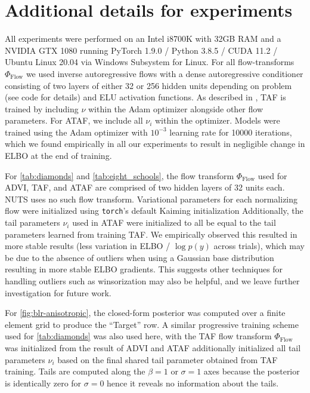 \documentclass[twoside]{article}
\theoremstyle{definition}
\theoremstyle{remark}
\begin{document}
{\section{Additional details for experiments}
\label{sec:additional-exp-details}

All experiments were performed on an Intel i8700K with 32GB RAM and a NVIDIA GTX 1080
running PyTorch 1.9.0 / Python 3.8.5 / CUDA 11.2 / Ubuntu Linux 20.04 via Windows Subsystem for Linux.
For all flow-transforms $\Phi_{\text{Flow}}$ we used inverse autoregressive flows \citep{kingma2016improved} with a
dense autoregressive conditioner consisting of two layers of either 32 or 256 hidden units depending on problem (see code for details) and
ELU activation functions.
As described in \cite{jaini2020tails}, TAF is trained by including $\nu$ within the Adam optimizer alongside other flow parameters. For ATAF, we include all $\nu_i$ within the optimizer.
Models were trained using the Adam optimizer with $10^{-3}$ learning rate
for 10000 iterations, which we found empirically in all our experiments to result in negligible change in ELBO
at the end of training.

For \cref{tab:diamonds} and \cref{tab:eight_schools}, the flow transform $\Phi_{\text{Flow}}$ used for ADVI, TAF, and ATAF
are comprised of two hidden layers of 32 units each. NUTS uses no such flow transform. Variational parameters for each normalizing flow were initialized
using \texttt{torch}'s default Kaiming initialization \citep{he2015delving} Additionally, the tail parameters $\nu_i$
used in ATAF were initialized to all be equal to the tail parameters learned from training TAF. We empirically observed
this resulted in more stable results (less variation in ELBO / $\log p(y)$ across trials), which may be due to
the absence of outliers when using a Gaussian base distribution resulting in more stable ELBO gradients. This suggests
other techniques for handling outliers such as winsorization may also be helpful, and we leave further investigation
for future work.


For \cref{fig:blr-anisotropic}, the closed-form posterior was computed over a finite element grid to produce
the ``Target'' row. A similar progressive training scheme used for \cref{tab:diamonds} was also used here, with
the TAF flow transform $\Phi_{\text{Flow}}$ was initialized from the result of ADVI and ATAF additionally initialized
all tail parameters $\nu_i$ based on the final shared tail parameter obtained from TAF training. Tails are computed
along the $\beta = 1$ or $\sigma = 1$ axes because the posterior is identically zero for $\sigma = 0$ hence it reveals
no information about the tails.
}
\end{document}

